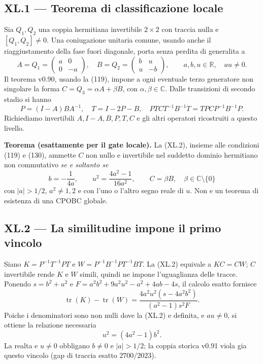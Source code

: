 \documentclass[11pt,a4paper]{article}
\begin{document}
\subsection*{XL.1 --- Teorema di classificazione locale}
Sia $Q_1,Q_2$ una coppia hermitiana invertibile $2\times2$ con traccia nulla e $[Q_1,Q_2]\ne0$. Una coniugazione unitaria comune, usando anche il riaggiustamento della fase fuori diagonale, porta senza perdita di generalita a
\begin{equation}
 A=Q_1=\begin{pmatrix}a&0\\0&-a\end{pmatrix},\quad
 B=Q_2=\begin{pmatrix}b&u\\u&-b\end{pmatrix},\qquad
 a,b,u\in\mathbb R,\quad au\ne0.\tag{XL.1}
\end{equation}
Il teorema v0.90, usando la (119), impone a ogni eventuale terzo generatore non singolare la forma $C=Q_3=\alpha A+\beta B$, con $\alpha,\beta\in\mathbb C$. Dalle transizioni di secondo stadio si hanno
\begin{equation}
 P=(I-A)BA^{-1},\quad T=I-2P-B,\quad
 PTCT^{-1}B^{-1}T=TP CP^{-1}B^{-1}P.\tag{XL.2}
\end{equation}
Richiediamo invertibili $A,I-A,B,P,T,C$ e gli altri operatori ricostruiti a questo livello.

\textbf{Teorema (esattamente per il gate locale).} La (XL.2), insieme alle condizioni (119) e (130), ammette $C$ non nullo e invertibile nel suddetto dominio hermitiano non commutativo \emph{se e soltanto se}
\begin{equation}
 \boxed{\quad b=-\frac{1}{4a},\qquad u^2=\frac{4a^2-1}{16a^2},\qquad
 C=\beta B,\quad\beta\in\mathbb C\setminus\{0\}\quad}\tag{XL.3}
\end{equation}
con $|a|>1/2$, $a^2\ne1,2$ e con l'uno o l'altro segno reale di $u$. Non e un teorema di esistenza di una CPOBC globale.

\subsection*{XL.2 --- La similitudine impone il primo vincolo}
Siano $K=P^{-1}T^{-1}PT$ e $W=P^{-1}B^{-1}PT^{-1}BT$. La (XL.2) equivale a $KC=CW$; $C$ invertibile rende $K$ e $W$ simili, quindi ne impone l'uguaglianza delle tracce. Ponendo $s=b^2+u^2$ e $F=a^2b^2+9a^2u^2-a^2+4ab-4s$, il calcolo esatto fornisce
\begin{equation}
 \operatorname{tr}(K)-\operatorname{tr}(W)=
 \frac{4a^2u^2(s-4a^2b^2)}{(a^2-1)s^2F}.\tag{XL.4}
\end{equation}
Poiche i denominatori sono non nulli dove la (XL.2) e definita, e $au\ne0$, si ottiene la relazione necessaria
\begin{equation}
 u^2=(4a^2-1)b^2.\tag{XL.5}
\end{equation}
La realta e $u\ne0$ obbligano $b\ne0$ e $|a|>1/2$; la coppia storica v0.91 viola gia questo vincolo (gap di traccia esatto $2700/2023$).
\end{document}
